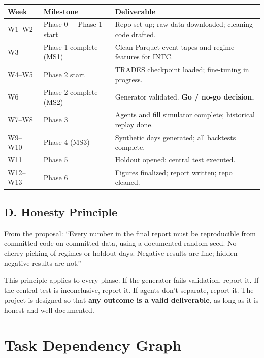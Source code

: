 \documentclass[11pt,a4paper]{article}
\begin{document}
\begin{center}
\begin{tabularx}{\textwidth}{llX}
\toprule
\textbf{Week} & \textbf{Milestone} & \textbf{Deliverable} \\
\midrule
W1--W2 & Phase 0 + Phase 1 start & Repo set up; raw data downloaded; cleaning code drafted. \\
W3 & Phase 1 complete (MS1) & Clean Parquet event tapes and regime features for INTC. \\
W4--W5 & Phase 2 start & TRADES checkpoint loaded; fine-tuning in progress. \\
W6 & Phase 2 complete (MS2) & Generator validated.  \textbf{Go / no-go decision.} \\
W7--W8 & Phase 3 & Agents and fill simulator complete; historical replay done. \\
W9--W10 & Phase 4 (MS3) & Synthetic days generated; all backtests complete. \\
W11 & Phase 5 & Holdout opened; central test executed. \\
W12--W13 & Phase 6 & Figures finalized; report written; repo cleaned. \\
\bottomrule
\end{tabularx}
\end{center}

\subsection*{D. Honesty Principle}

From the proposal: ``Every number in the final report must be reproducible from committed code on committed data, using a documented random seed.  No cherry-picking of regimes or holdout days.  Negative results are fine; hidden negative results are not.''

This principle applies to every phase.  If the generator fails validation, report it.  If the central test is inconclusive, report it.  If agents don't separate, report it.  The project is designed so that \textbf{any outcome is a valid deliverable}, as long as it is honest and well-documented.


\newpage
\section*{Task Dependency Graph}
\end{document}
